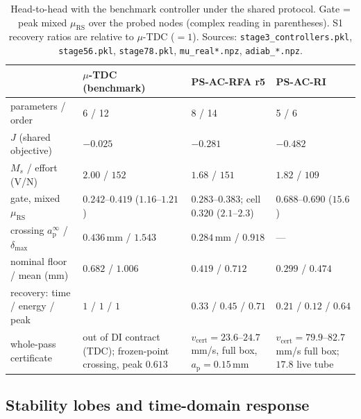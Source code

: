 \documentclass[preprint,12pt]{elsarticle}
\newcommand{\ap}{a_{\mathrm{p}}}
\newcommand{\vcert}{v_{\mathrm{cert}}}
\newcommand{\muRS}{\mu_{\mathrm{RS}}}
\begin{document}
\begin{table}[t]
\centering\footnotesize
\setlength{\tabcolsep}{5pt}
\caption{Head-to-head with the benchmark controller under the shared
protocol.  Gate = peak mixed $\muRS$ over the probed nodes (complex
reading in parentheses).  S1 recovery ratios are relative to
$\mu$-TDC ($=1$).  Sources: \texttt{stage3\_controllers.pkl},
\texttt{stage56.pkl}, \texttt{stage78.pkl},
\texttt{mu\_real*.npz}, \texttt{adiab\_*.npz}.}
\label{tab:head2head}
\begin{tabular}{@{}p{3.9cm}p{2.9cm}p{3.0cm}p{2.7cm}@{}}
\toprule
 & $\mu$-TDC (benchmark) & PS-AC-RFA r5 & PS-AC-RI \\
\midrule
parameters / order & 6 / 12 & 8 / 14 & 5 / 6 \\
$J$ (shared objective) & $-0.025$ & $-0.281$ & $-0.482$ \\
$M_s$ / effort (V/N) & $2.00$ / $152$ & $1.68$ / $151$ & $1.82$ /
$109$ \\
gate, mixed $\muRS$ & $0.242$--$0.419$ ($1.16$--$1.21$) &
$0.283$--$0.383$; cell $0.320$ ($2.1$--$2.3$) & $0.688$--$0.690$
($15.6$) \\
crossing $\ap^{\infty}$ / $\delta_{\max}$ & $0.436$\,mm / $1.543$ &
$0.284$\,mm / $0.918$ & --- \\
nominal floor / mean (mm) & $0.682$ / $1.006$ & $0.419$ / $0.712$ &
$0.299$ / $0.474$ \\
recovery: time / energy / peak & $1$ / $1$ / $1$ &
$0.33$ / $0.45$ / $0.71$ & $0.21$ / $0.12$ / $0.64$ \\
whole-pass certificate & out of DI contract (TDC); frozen-point
crossing, peak $0.613$ & $\vcert = 23.6$--$24.7$\,mm/s, full box,
$\ap = 0.15$\,mm & $\vcert = 79.9$--$82.7$\,mm/s full box;
$17.8$ live tube \\
\bottomrule
\end{tabular}
\end{table}

\subsection*{Stability lobes and time-domain response}
\end{document}
